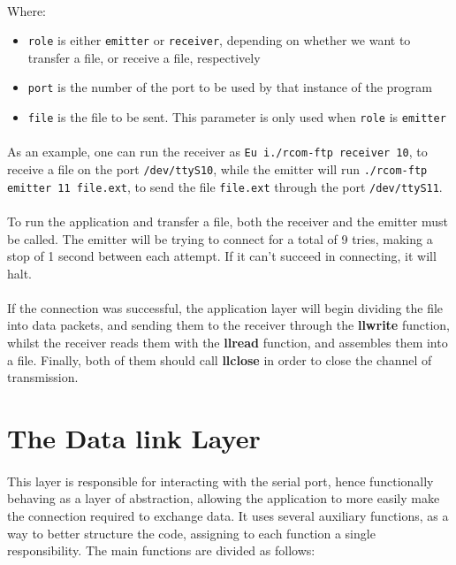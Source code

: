 \documentclass[11pt]{article}
\begin{document}
\paragraph{}Where:
\begin{itemize}
        \item{\verb|role| is either \verb|emitter| or \verb|receiver|, depending on whether we want to transfer a file, or receive a file, respectively}
        \item{\verb|port| is the number of the port to be used by that instance of the program}
        \item{\verb|file| is the file to be sent. This parameter is only used when \verb|role| is \verb|emitter|}
\end{itemize}

\paragraph{}As an example, one can run the receiver as \verb|Eu i./rcom-ftp receiver 10|, to receive a file on the port \verb|/dev/ttyS10|, while the emitter will run \verb|./rcom-ftp emitter 11 file.ext|, to send the file \verb|file.ext| through the port \verb|/dev/ttyS11|.

\paragraph{} To run the application and transfer a file, both the receiver and the emitter must be called. The emitter
will be trying to connect for a total of 9 tries, making a stop of 1 second between each attempt. If it can't
succeed in connecting, it will halt.

\paragraph{}If the connection was successful, the application layer will begin dividing the file into data
packets, and sending them to the receiver through the \textbf{llwrite} function, whilst the receiver reads them with the \textbf{llread} function, and assembles them into a file. Finally, both of them should call \textbf{llclose} in order to close the channel of transmission.

\section{The Data link Layer}

\paragraph{}This layer is responsible for interacting with the serial port, hence functionally behaving as a layer of abstraction, allowing the application to more easily make the connection required to exchange data. It uses several auxiliary functions, as
a way to better structure the code, assigning to each function a single responsibility. The main functions
are divided as follows:
\end{document}
